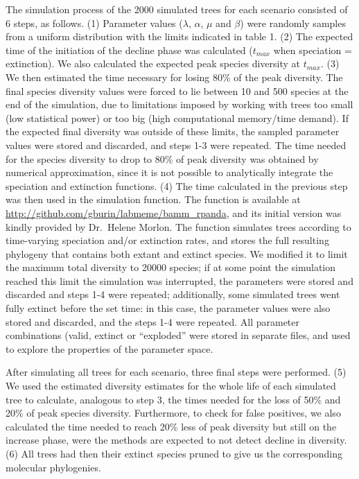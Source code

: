 \documentclass[11pt,]{article}
\begin{document}
The simulation process of the 2000 simulated trees for each scenario
consisted of 6 steps, as follows. (1) Parameter values (\(\lambda\),
\(\alpha\), \(\mu\) and \(\beta\)) were randomly samples from a uniform
distribution with the limits indicated in table 1. (2) The expected time
of the initiation of the decline phase was calculated (\(t_{max}\) when
speciation = extinction). We also calculated the expected peak species
diversity at \(t_{max}\). (3) We then estimated the time necessary for
losing 80\% of the peak diversity. The final species diversity values
were forced to lie between 10 and 500 species at the end of the
simulation, due to limitations imposed by working with trees too small
(low statistical power) or too big (high computational memory/time
demand). If the expected final diversity was outside of these limits,
the sampled parameter values were stored and discarded, and steps 1-3
were repeated. The time needed for the species diversity to drop to 80\%
of peak diversity was obtained by numerical approximation, since it is
not possible to analytically integrate the speciation and extinction
functions. (4) The time calculated in the previous step was then used in
the simulation function. The function is available at
\url{http://github.com/gburin/labmeme/bamm_rpanda}, and its initial
version was kindly provided by Dr.~Helene Morlon. The function simulates
trees according to time-varying speciation and/or extinction rates, and
stores the full resulting phylogeny that contains both extant and
extinct species. We modified it to limit the maximum total diversity to
20000 species; if at some point the simulation reached this limit the
simulation was interrupted, the parameters were stored and discarded and
steps 1-4 were repeated; additionally, some simulated trees went fully
extinct before the set time: in this case, the parameter values were
also stored and discarded, and the steps 1-4 were repeated. All
parameter combinations (valid, extinct or ``exploded'' were stored in
separate files, and used to explore the properties of the parameter
space.

After simulating all trees for each scenario, three final steps were
performed. (5) We used the estimated diversity estimates for the whole
life of each simulated tree to calculate, analogous to step 3, the times
needed for the loss of 50\% and 20\% of peak species diversity.
Furthermore, to check for false positives, we also calculated the time
needed to reach 20\% less of peak diversity but still on the increase
phase, were the methods are expected to not detect decline in diversity.
(6) All trees had then their extinct species pruned to give us the
corresponding molecular phylogenies.
\end{document}
